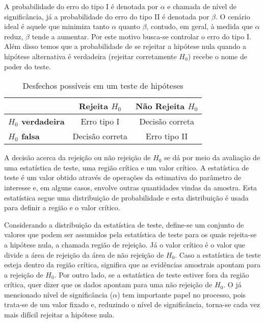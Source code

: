 A probabilidade do erro do tipo I é denotada por $\alpha$ e chamada de nível de significância, já a probabilidade do erro do tipo II é denotada por $\beta$. O cenário ideal é aquele que minimiza tanto $\alpha$ quanto $\beta$, contudo, em geral, à medida que $\alpha$ reduz, $\beta$ tende a aumentar. Por este motivo busca-se controlar o erro do tipo I. Além disso temos que a probabilidade de se rejeitar a hipótese nula quando a hipótese alternativa é verdadeira (rejeitar corretamente $H_0$) recebe o nome de poder do teste.

\begin{table}[h]
\centering
\begin{tabular}{l|cc}
\hline
\multicolumn{1}{c|}{}    & \textbf{Rejeita $H_0$} & \textbf{Não Rejeita $H_0$} \\ \hline
\textbf{$H_0$ verdadeira} & Erro tipo I           & Decisão correta           \\
\textbf{$H_0$ falsa}      & Decisão correta       & Erro tipo II              \\ \hline
\end{tabular}
\caption{Desfechos possíveis em um teste de hipóteses}
\label{tab:desfechos}
\end{table}

A decisão acerca da rejeição ou não rejeição de $H_0$ se dá por meio da avaliação de uma estatística de teste, uma região crítica e um valor crítico. A estatística de teste é um valor obtido através de operações da estimativa do parâmetro de interesse e, em alguns casos, envolve outras quantidades vindas da amostra. Esta estatística segue uma distribuição de probabilidade e esta distribuição é usada para definir a região e o valor crítico.

Considerando a distribuição da estatística de teste, define-se um conjunto de valores que podem ser assumidos pela estatística de teste para os quais rejeita-se a hipótese nula, a chamada região de rejeição. Já o valor crítico é o valor que divide a área de rejeição da área de não rejeição de $H_0$. Caso a estatística de teste esteja dentro da região crítica, significa que as evidências amostrais apontam para a rejeição de $H_0$. Por outro lado, se a estatística de teste estiver fora da região crítica, quer dizer que os dados apontam para uma não rejeição de $H_0$. O já mencionado nível de significância ($\alpha$) tem importante papel no processo, pois trata-se de um valor fixado e, reduzindo o nível de significância, torna-se cada vez mais difícil rejeitar a hipótese nula.

